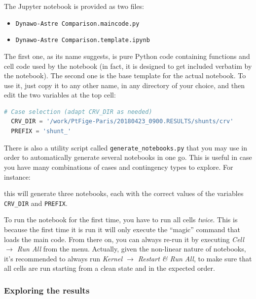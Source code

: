 \documentclass[11pt, a4paper, twoside, titlepage]{article}
\newcommand{\code}[1]{\texttt{#1}}
\begin{document}
The Jupyter notebook is provided as two files:
\begin{itemize}
\item \code{Dynawo-Astre Comparison.maincode.py}
\item \code{Dynawo-Astre Comparison.template.ipynb}
\end{itemize}
The first one, as its name suggests, is pure Python code containing
functions and cell code used by the notebook (in fact, it is designed
to get included verbatim by the notebook). The second one is the base
template for the actual notebook. To use it, just copy it to any other
name, in any directory of your choice, and then edit the two variables
at the top cell:
\begin{lstlisting}[language=python]
  # Case selection (adapt CRV_DIR as needed)
  CRV_DIR = '/work/PtFige-Paris/20180423_0900.RESULTS/shunts/crv'
  PREFIX = 'shunt_'
\end{lstlisting}
There is also a utility script called \code{generate\_notebooks.py}
that you may use in order to automatically generate several notebooks
in one go. This is useful in case you have many combinations of cases
and contingency types to explore. For instance:
this will generate three notebooks, each with the correct values of
the variables \code{CRV\_DIR} and \code{PREFIX}.

To run the notebook for the first time, you have to run all cells
\emph{twice}. This is because the first time it is run it will only
execute the ``magic'' command that loads the main code.  From there
on, you can always re-run it by executing \emph{Cell $\rightarrow$ Run
  All} from the menu. Actually, given the non-linear nature of
notebooks, it's recommended to always run \emph{Kernel $\rightarrow$
  Restart \& Run All}, to make sure that all cells are run starting
from a clean state and in the expected order.


\subsubsection{Exploring the results}
\end{document}

